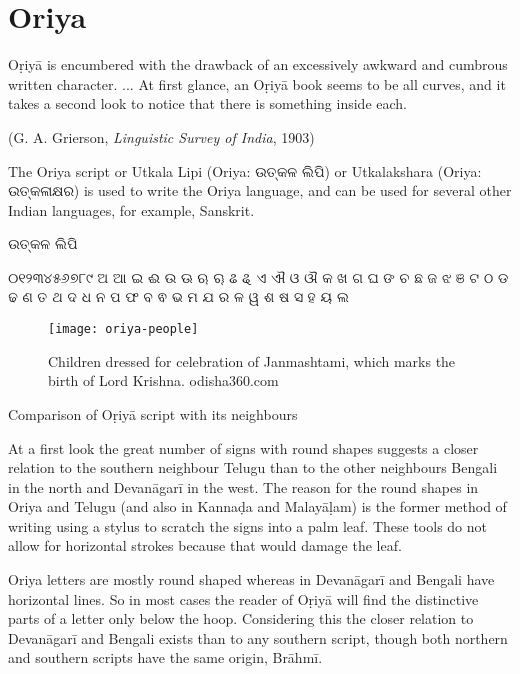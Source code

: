 \section{Oriya}
\label{s:oriya}
\epigraph{Oṛiyā is encumbered with the drawback of an excessively awkward and cumbrous written character. ... At first glance, an Oṛiyā book seems to be all curves, and it takes a second look to notice that there is something inside each.}{(G. A. Grierson, \textit{Linguistic Survey of India}, 1903)}

\newfontfamily{}

\def\oriyatext#1{{\oriya#1}}
The Oriya script or Utkala Lipi (Oriya: \oriyatext{ଉତ୍କଳ ଲିପି}) or Utkalakshara (Oriya: \oriyatext{ଉତ୍କଳାକ୍ଷର}) is used to write the Oriya language, and can be used for several other Indian languages, for example, Sanskrit.

\centerline{\Huge\oriyatext{ଉତ୍କଳ ଲିପି}}

\bgroup
\oriya
୦୧୨୩୪୫୬୭୮୯
ଅ ଆ ଇ ଈ ଉ ଊ ଋ ୠ ଌ ୡ ଏ ଐ ଓ ଔ କ ଖ ଗ ଘ ଙ ଚ ଛ ଜ ଝ ଞ ଟ ଠ ଡ ଢ ଣ ତ ଥ ଦ ଧ ନ ପ ଫ ବ ଵ ଭ ମ ଯ ର ଳ ୱ ଶ ଷ ସ ହ ୟ ଲ
\egroup






\begin{figure}[htbp]
\centering

\texttt{[image: oriya-people]}

\hspace*{-1em}\caption{Children dressed for celebration of Janmashtami, which marks the birth of Lord Krishna. odisha360.com}
\end{figure}

Comparison of Oṛiyā script with its neighbours

At a first look the great number of signs with round shapes suggests a closer relation to the southern neighbour Telugu than to the other neighbours Bengali in the north and Devanāgarī in the west. The reason for the round shapes in Oriya and Telugu (and also in Kannaḍa and Malayāḷam) is the former method of writing using a stylus to scratch the signs into a palm leaf. These tools do not allow for horizontal strokes because that would damage the leaf.

Oriya letters are mostly round shaped whereas in Devanāgarī and Bengali have horizontal lines. So in most cases the reader of Oṛiyā will find the distinctive parts of a letter only below the hoop. Considering this the  closer relation to Devanāgarī and Bengali exists than to any southern script, though both northern and southern scripts have the same origin, Brāhmī.

